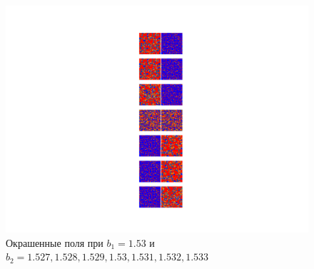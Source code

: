 \documentclass[12pt]{article}
\begin{document}
        \begin{figure}[H]
            \centering
            \includegraphics[width=0.95\columnwidth, keepaspectratio=True]{DoubleField/colored_2fields153.png}
            \caption{Окрашенные поля при $b_1=1.53$ и $b_2=1.527, 1.528, 1.529, 1.53, 1.531, 1.532, 1.533$}
            \label{fig:DfieldsFixb1}
        \end{figure}
\end{document}
